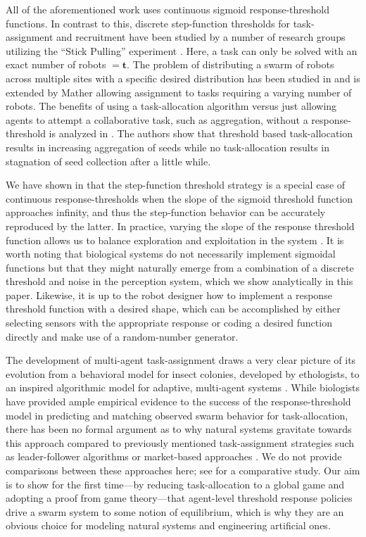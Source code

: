 \documentclass[conference]{ieeeconf}
\newcommand{\td}{\mathbf{t}}
\begin{document}
All of the aforementioned work uses continuous sigmoid response-threshold functions. In contrast to this, discrete step-function thresholds for task-assignment and recruitment have been studied by a number of research groups utilizing the ``Stick Pulling'' experiment \cite{Martinoli1995, Martinoli1998, Lerman2001, Martinoli2004}. Here, a task can only be solved with an exact number of robots $= \td$. The problem of distributing a swarm of robots across multiple sites with a specific desired distribution has been studied in \cite{Berman2009, Correll2008} and is extended by Mather \cite{Mather2010} allowing assignment to tasks requiring a varying number of robots. The benefits of using a task-allocation algorithm versus just allowing agents to attempt a collaborative task, such as aggregation, without a response-threshold is analyzed in \cite{Agassounon2001}. The authors show that threshold based task-allocation results in increasing aggregation of seeds while no task-allocation results in stagnation of seed collection after a little while. 

We have shown in \cite{Kanakia2014} that the step-function threshold strategy is a special case of continuous response-thresholds when the slope of the sigmoid threshold function approaches infinity, and thus the step-function behavior can be accurately reproduced by the latter. In practice, varying the slope of the response threshold function allows us to balance exploration and exploitation in the system \cite{Bonabeau1997}. It is worth noting that biological systems do not necessarily implement sigmoidal functions but that they might naturally emerge from a combination of a discrete threshold and noise in the perception system, which we show analytically in this paper. Likewise, it is up to the robot designer how to implement a response threshold function with a desired shape, which can be accomplished by either selecting sensors with the appropriate response or coding a desired function directly and make use of a random-number generator. 

The development of multi-agent task-assignment draws a very clear picture of its evolution from a behavioral model for insect colonies, developed by ethologists, to an inspired algorithmic model for adaptive, multi-agent systems \cite{Krieger2000}. While biologists have provided ample empirical evidence to the success of the response-threshold model in predicting and matching observed swarm behavior for task-allocation, there has been no formal argument as to why natural systems gravitate towards this approach compared to previously mentioned task-assignment strategies such as leader-follower algorithms \cite{Chen2011} or market-based approaches \cite{Amstutz2008,Vig2007}. We do not provide comparisons between these approaches here; see \cite{Kalra2006} for a comparative study. Our aim is to show for the first time---by reducing task-allocation to a global game and adopting a proof from game theory\cite{Carlsson1993}---that agent-level threshold response policies drive a swarm system to some notion of equilibrium, which is why they are an obvious choice for modeling natural systems and engineering artificial ones.
\end{document}
